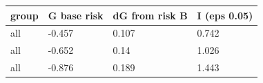 \begingroup\small
\setlength{\tabcolsep}{3pt}
\renewcommand{\arraystretch}{1.04}
\begin{tabularx}{\linewidth}{XXXX}
\toprule
group & G base risk & dG from risk B & I (eps 0.05) \\
\midrule
all & -0.457 & 0.107 & 0.742 \\
all & -0.652 & 0.14 & 1.026 \\
all & -0.876 & 0.189 & 1.443 \\
\bottomrule
\end{tabularx}
\endgroup
